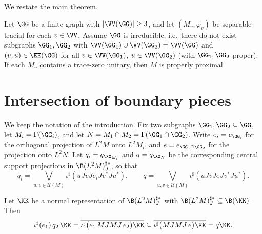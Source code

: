 We restate the main theorem.

\begin{maintheorem}\label{thm:main}
Let $\GG$ be a finite graph with $|\VV(\GG)|\geq 3$, and let $(M_v,\varphi_v)$ be separable
tracial for each $v\in\VV$. Assume $\GG$ is irreducible, i.e.\ there do not exist subgraphs
$\GG_1,\GG_2$ with $\VV(\GG_1)\cup\VV(\GG_2)=\VV(\GG)$ and $(v,u)\in\EE(\GG)$ for all
$v\in\VV(\GG_1)$, $u\in\VV(\GG_2)$ (with $\GG_1,\GG_2$ proper). If each $M_v$ contains a
trace-zero unitary, then $M$ is properly proximal.
\end{maintheorem}

\section{Intersection of boundary pieces}

We keep the notation of the introduction. Fix two subgraphs $\GG_1,\GG_2\subseteq\GG$, let
$M_i=\Gamma(\GG_i)$, and let $N=M_1\cap M_2=\Gamma(\GG_1\cap\GG_2)$. Write
$e_i=e_{\GG_i}$ for the orthogonal projection of $L^2M$ onto $L^2M_i$, and $e=e_{\GG_1\cap\GG_2}$
for the projection onto $L^2N$. Let $q_i=q_{\XX_{M_i}}$ and $q=q_{\XX_N}$ be the
corresponding central support projections in $\B(L^2M)^{\sharp*}_J$, so that
\[
q_i=\bigvee_{u,v\in\mathcal{U}(M)}\iota^\sharp(uJvJe_iJv^*Ju^*),\qquad
q=\bigvee_{u,v\in\mathcal{U}(M)}\iota^\sharp(uJvJeJv^*Ju^*).
\]

\begin{lemma}\label{lem:keyincl}
Let $\KK$ be a normal representation of $\B(L^2M)^{\sharp*}_J$ with
$\B(L^2M)^{\sharp*}_J\subseteq\B(\KK)$. Then
\[
\iota^\sharp(e_1)\,q_2\,\KK
=\overline{\iota^\sharp\big(e_1\,MJMJ\,e_2\big)\KK}
\subseteq \overline{\iota^\sharp\big(MJMJ\,e\big)\KK}=q\KK .
\]
\end{lemma}

